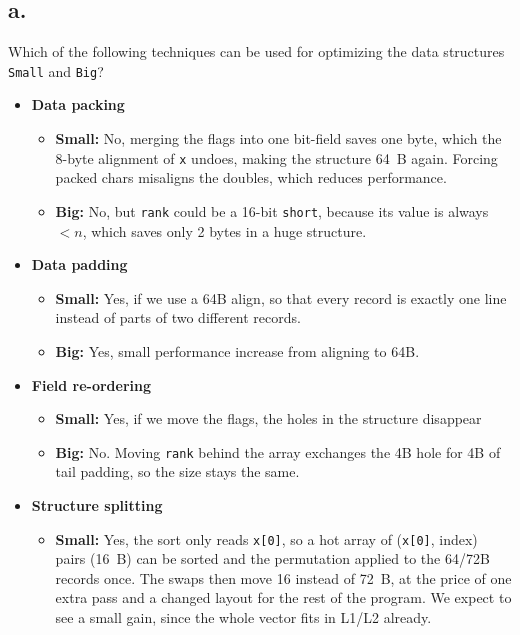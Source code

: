 \documentclass[a4paper,11pt]{article}
\begin{document}
\subsection{a.}
Which of the following techniques can be used for optimizing the data structures \texttt{Small} and \texttt{Big}?
\begin{itemize}
    \item \textbf{Data packing}
        \begin{itemize}
            \item \textbf{Small:} No, merging the flags into one bit-field saves one byte, which the 8-byte
                alignment of \texttt{x} undoes, making the structure 64~B again. Forcing packed chars misaligns the doubles, which reduces
                performance.
            \item \textbf{Big:} No, but \texttt{rank} could be a 16-bit \texttt{short},
                because its value is always $< n$, which saves only 2 bytes in a huge structure.
        \end{itemize}
    \item \textbf{Data padding}
        \begin{itemize}
            \item \textbf{Small:} Yes, if we use a 64B align, so that every record is exactly one
                line instead of parts of two different records.
            \item \textbf{Big:} Yes, small performance increase from aligning to 64B.
        \end{itemize}
    \item \textbf{Field re-ordering}
        \begin{itemize}
            \item \textbf{Small:} Yes, if we move the flags, the holes in the structure disappear
            \item \textbf{Big:} No. Moving \texttt{rank} behind the array exchanges the
                4B hole for 4B of tail padding, so the size stays the same.
        \end{itemize}
    \item \textbf{Structure splitting}
        \begin{itemize}
            \item \textbf{Small:} Yes, the sort only reads \texttt{x[0]}, so a hot
                array of (\texttt{x[0]}, index) pairs (16~B) can be sorted and the
                permutation applied to the 64/72B records once. The swaps then move 16
                instead of 72~B, at the price of one extra pass and a changed layout for
                the rest of the program. We expect to see a small gain, since the whole vector
                fits in L1/L2 already.


\end{itemize}
\end{itemize}
\end{document}
